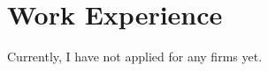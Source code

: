 \documentclass[]{resume-openfont}
\newcommand{\resumeHeading}[4]{\runsubsection{\uppercase{#1}}\descript{ | #2}\hfill\location{#3 | #4}\fakeNewLine}
\begin{document}
\section{Work Experience}


Currently, I have not applied for any firms yet.
\end{document}
